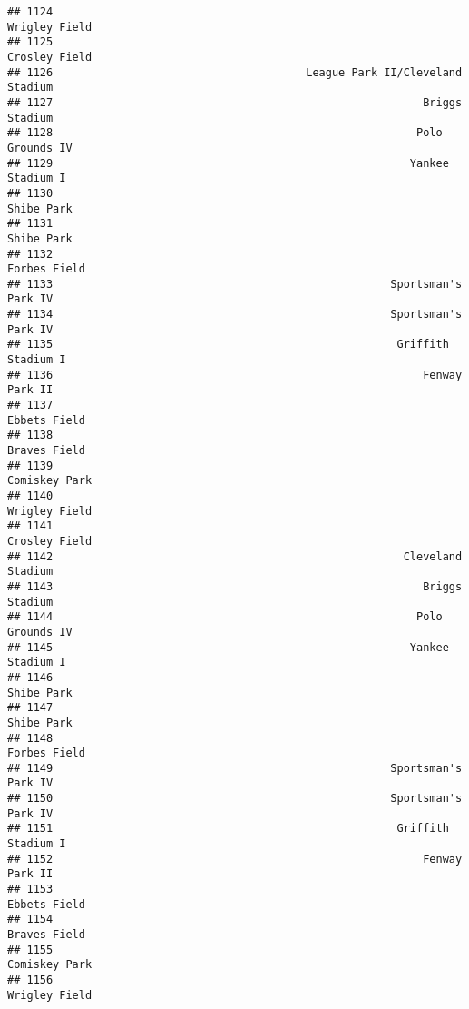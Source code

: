 \documentclass[]{article}
\begin{document}
\begin{verbatim}
## 1124                                                          Wrigley Field
## 1125                                                          Crosley Field
## 1126                                       League Park II/Cleveland Stadium
## 1127                                                         Briggs Stadium
## 1128                                                        Polo Grounds IV
## 1129                                                       Yankee Stadium I
## 1130                                                             Shibe Park
## 1131                                                             Shibe Park
## 1132                                                           Forbes Field
## 1133                                                    Sportsman's Park IV
## 1134                                                    Sportsman's Park IV
## 1135                                                     Griffith Stadium I
## 1136                                                         Fenway Park II
## 1137                                                           Ebbets Field
## 1138                                                           Braves Field
## 1139                                                          Comiskey Park
## 1140                                                          Wrigley Field
## 1141                                                          Crosley Field
## 1142                                                      Cleveland Stadium
## 1143                                                         Briggs Stadium
## 1144                                                        Polo Grounds IV
## 1145                                                       Yankee Stadium I
## 1146                                                             Shibe Park
## 1147                                                             Shibe Park
## 1148                                                           Forbes Field
## 1149                                                    Sportsman's Park IV
## 1150                                                    Sportsman's Park IV
## 1151                                                     Griffith Stadium I
## 1152                                                         Fenway Park II
## 1153                                                           Ebbets Field
## 1154                                                           Braves Field
## 1155                                                          Comiskey Park
## 1156                                                          Wrigley Field

\end{verbatim}
\end{document}
